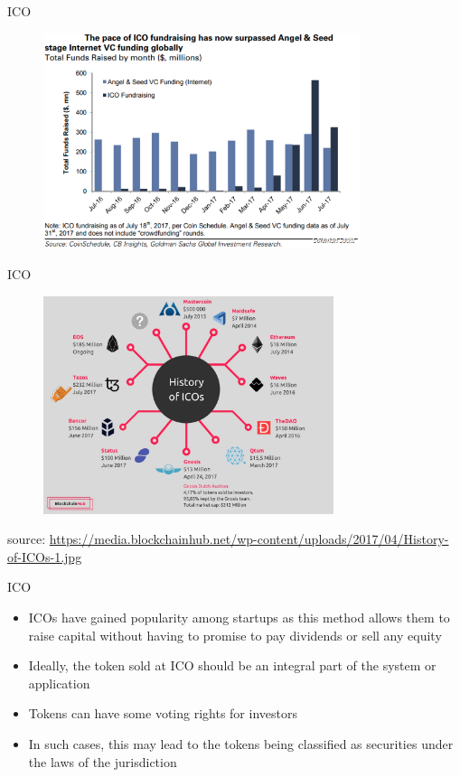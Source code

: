 \documentclass[11pt]{beamer}
\begin{document}
\begin{frame}{ICO}
	\begin{figure}[]
		\centering
		\includegraphics  [width=93mm]{Images/ico2}
	\end{figure}
\end{frame}


\begin{frame}{ICO}
	\begin{figure}[]
		\centering
		\includegraphics  [width=85mm]{Images/ico1}
	\end{figure}
	\begin{scriptsize}
		source: \href{https://blockchainhub.net/ico-initial-coin-offerings/}{https://media.blockchainhub.net/wp-content/uploads/2017/04/History-of-ICOs-1.jpg}
	\end{scriptsize}
\end{frame}


\begin{frame}{ICO}
	\begin{itemize}
		\item ICOs have gained popularity among startups as this method allows them to raise capital without having to promise to pay dividends or sell any equity
		\item Ideally, the token sold at ICO should be an integral part of the system or application
		\item Tokens can have some voting rights for investors
		\item In such cases, this may lead to the tokens being classified as securities under the laws of the jurisdiction
	\end{itemize}
\end{frame}
\end{document}
